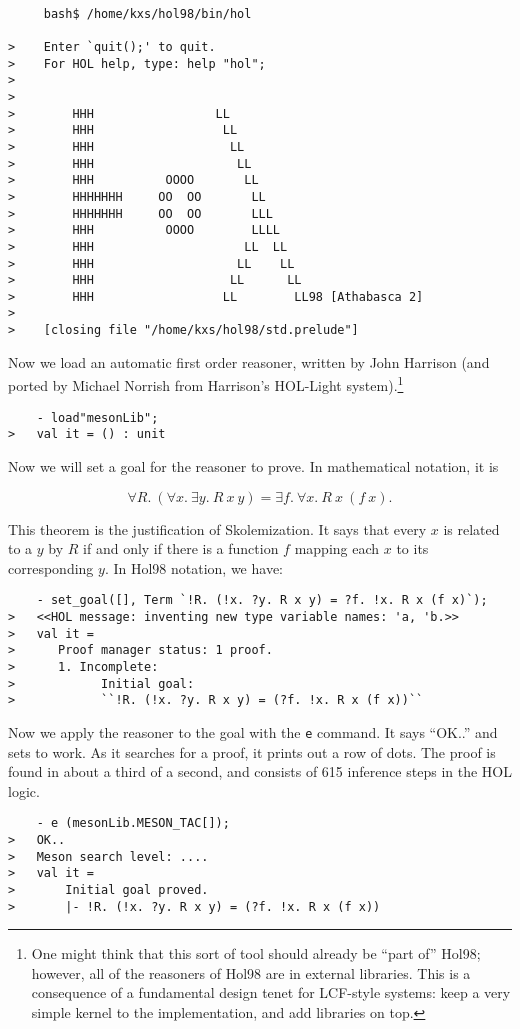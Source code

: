 \documentclass[12pt,fleqn,layout,a4paper]{report}
\begin{document}
\begin{verbatim}

     bash$ /home/kxs/hol98/bin/hol

>    Enter `quit();' to quit.
>    For HOL help, type: help "hol";
>
>
>        HHH                 LL
>        HHH                  LL
>        HHH                   LL
>        HHH                    LL
>        HHH          OOOO       LL
>        HHHHHHH     OO  OO       LL
>        HHHHHHH     OO  OO       LLL
>        HHH          OOOO        LLLL
>        HHH                     LL  LL
>        HHH                    LL    LL
>        HHH                   LL      LL
>        HHH                  LL        LL98 [Athabasca 2]
>
>    [closing file "/home/kxs/hol98/std.prelude"]

\end{verbatim}

Now we load an automatic first order reasoner, written by John
Harrison (and ported by Michael Norrish from Harrison's HOL-Light
system).\footnote{One might think that this sort of tool should
  already be ``part of'' Hol98; however, all of the reasoners of Hol98
  are in external libraries. This is a consequence of a fundamental
  design tenet for LCF-style systems: keep a very simple kernel to the
  implementation, and add libraries on top.}
\begin{verbatim}
    - load"mesonLib";
>   val it = () : unit
\end{verbatim}

Now we will set a goal for the reasoner to prove. In mathematical
notation, it is

\[\forall R.\ (\forall x.\  \exists y.\ R\ x\ y) = \exists f.\ \forall
 x.\ R\ x\ (f\ x).\]

 This theorem is the justification of Skolemization. It says that
every $x$ is related to a $y$ by $R$ if and only if there is
a function $f$ mapping each $x$ to its corresponding $y$. In Hol98
notation, we have:
\begin{verbatim}
    - set_goal([], Term `!R. (!x. ?y. R x y) = ?f. !x. R x (f x)`);
>   <<HOL message: inventing new type variable names: 'a, 'b.>>
>   val it =
>      Proof manager status: 1 proof.
>      1. Incomplete:
>            Initial goal:
>            ``!R. (!x. ?y. R x y) = (?f. !x. R x (f x))``
\end{verbatim}

Now we apply the reasoner to the goal with the \verb+e+ command. It says
``OK..'' and sets to work. As it searches for a proof, it prints out a
row of dots. The proof is found in about a third of a second, and
consists of 615 inference steps in the HOL logic.
\begin{verbatim}
    - e (mesonLib.MESON_TAC[]);
>   OK..
>   Meson search level: ....
>   val it =
>       Initial goal proved.
>       |- !R. (!x. ?y. R x y) = (?f. !x. R x (f x))
\end{verbatim}
\end{document}
